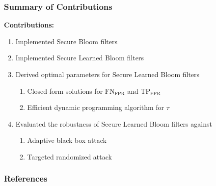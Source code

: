 \documentclass{beamer}
\begin{document}
\begin{frame}
\frametitle{Summary of Contributions}

\textbf{Contributions:}
\begin{enumerate}
    \item Implemented Secure Bloom filters
    \item Implemented Secure Learned Bloom filters
    \item Derived optimal parameters for Secure Learned Bloom filters
    \begin{enumerate}
        \item Closed-form solutions for $\text{FN}_\text{FPR}$ and $\text{TP}_\text{FPR}$
        \item Efficient dynamic programming algorithm for $\tau$
    \end{enumerate}
    \item Evaluated the robustness of Secure Learned Bloom filters against
    \begin{enumerate}
        \item Adaptive black box attack
        \item Targeted randomized attack
    \end{enumerate}
\end{enumerate}

\end{frame}


\begin{frame}
\frametitle{References}

\printbibliography

\end{frame}
\end{document}
